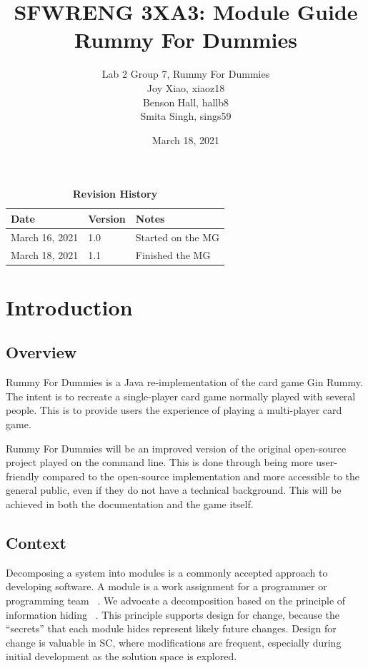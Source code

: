 \documentclass[12pt, titlepage]{article}
\title{SFWRENG 3XA3: Module Guide\\Rummy For Dummies}
\author{Lab 2 Group 7, Rummy For Dummies
		\\ Joy Xiao, xiaoz18
		\\ Benson Hall, hallb8
		\\ Smita Singh, sings59
}
\date{March 18, 2021}
\begin{document}
\maketitle

\tableofcontents
\listoftables
\listoffigures

\begin{table}[bp]
    \caption{\bf Revision History}
    \begin{tabularx}{\textwidth}{p{3cm}p{2cm}X}
        \toprule {\bf Date} & {\bf Version} & {\bf Notes}\\
        \midrule
        March 16, 2021 & 1.0 & Started on the MG\\
        March 18, 2021 & 1.1 & Finished the MG\\
        \bottomrule
    \end{tabularx}
\end{table}

\newpage


\section{Introduction}
\subsection{Overview}
Rummy For Dummies is a Java re-implementation of the card game Gin Rummy. The intent is to recreate a single-player card game normally played with several people. This is to provide users the experience of playing a multi-player card game. 

Rummy For Dummies will be an improved version of the original open-source project played on the command line. This is done through being more user-friendly compared to the open-source implementation and more accessible to the general public, even if they do not have a technical background. This will be achieved in both the documentation and the game itself.

\subsection{Context}
Decomposing a system into modules is a commonly accepted approach to developing software. A module is a work assignment for a programmer or programming team ~\citep{ParnasEtAl1984}.
We advocate a decomposition based on the principle of information hiding ~\citep{Parnas1972a}.
This principle supports design for change, because the ``secrets'' that each module hides represent likely future changes.  Design for change is valuable in SC, where modifications are frequent, especially during initial development as the solution space is explored.  
\end{document}
